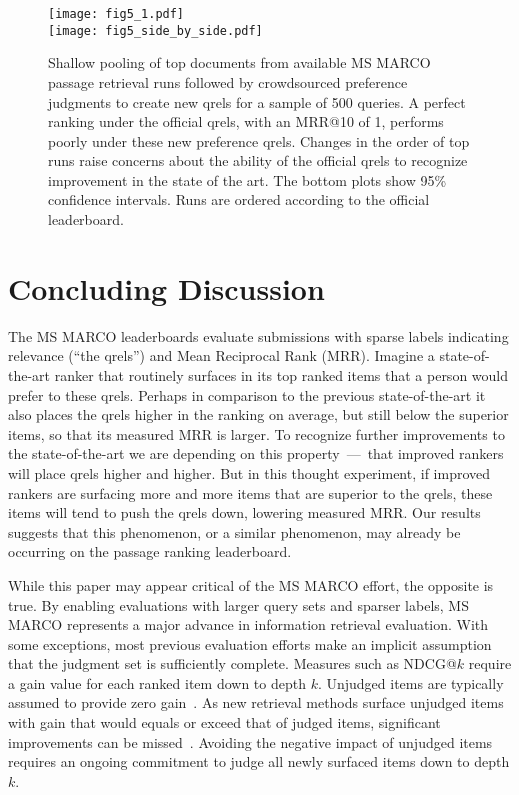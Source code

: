 \documentclass[fullpage]{article}
\begin{document}
\begin{figure}[t]
    \centering
    \texttt{[image: fig5\_1.pdf]}\\
    \texttt{[image: fig5\_side\_by\_side.pdf]}
    \caption{Shallow pooling of top documents from available MS MARCO passage retrieval runs followed by crowdsourced preference judgments to create new qrels for a sample of 500 queries. A perfect ranking under the official qrels, with an MRR@10 of 1, performs poorly under these new preference qrels. Changes in the order of top runs raise concerns about the ability of the official qrels to recognize improvement in the state of the art. The bottom plots show 95\% confidence intervals. Runs are ordered according to the official leaderboard.}
    \label{fig:main}
\end{figure}


\section{Concluding Discussion}

The MS MARCO leaderboards evaluate submissions with sparse labels indicating relevance (``the qrels'') and Mean Reciprocal Rank (MRR). Imagine a state-of-the-art ranker that routinely surfaces in its top ranked items that a person would prefer to these qrels. Perhaps in comparison to the previous state-of-the-art it also places the qrels higher in the ranking on average, but still below the superior items, so that its measured MRR is larger. To recognize further improvements to the state-of-the-art we are depending on this property~---~that improved rankers will place qrels higher and higher. But in this thought experiment, if improved rankers are surfacing more and more items that are superior to the qrels, these items will tend to push the qrels down, lowering measured MRR. Our results suggests that this phenomenon, or a similar phenomenon, may already be occurring on the passage ranking leaderboard. 

While this paper may appear critical of the MS MARCO effort, the opposite is true. By enabling evaluations with larger query sets and sparser labels, MS MARCO represents a major advance in information retrieval evaluation. With some exceptions, most previous evaluation efforts make an implicit assumption that the judgment set is sufficiently complete. Measures such as NDCG@$k$ require a gain value for each ranked item down to depth $k$. Unjudged items are typically assumed to provide zero gain~\cite{sakai07}. As new retrieval methods surface unjudged items with gain that would equals or exceed that of judged items, significant improvements can be missed~\cite{ycmmc20}. Avoiding the negative impact of unjudged items requires an ongoing commitment to judge all newly surfaced items down to depth $k$.
\end{document}
